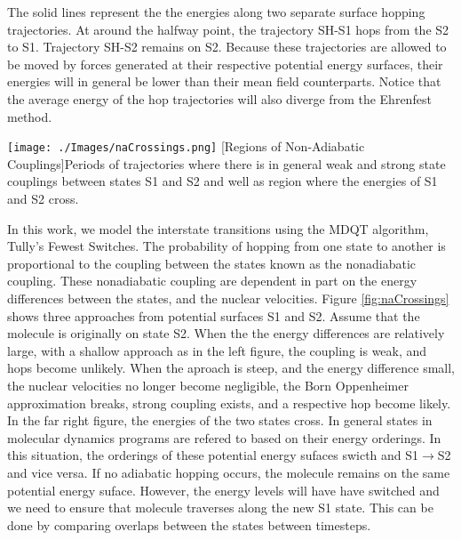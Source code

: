 The solid lines represent the the energies along two separate surface hopping trajectories.
At around the halfway point, the trajectory SH-S1 hops from the S2 to S1.
Trajectory SH-S2 remains on S2.
Because these trajectories are allowed to be moved by forces generated at their respective potential energy surfaces, their energies will in general be lower than their mean field counterparts.
Notice that the average energy of the hop trajectories will also diverge from the Ehrenfest method.

\noindent
\begin{minipage}[c]{\textwidth}
  \centering
  \texttt{[image: ./Images/naCrossings.png]}
  [Regions of Non-Adiabatic Couplings]{Periods of trajectories where there is in general weak and strong state couplings between states S1 and S2 and well as region where the energies of S1 and S2 cross.}
  \label{fig:naCrossings}
\end{minipage}\bigskip

In this work, we model the interstate transitions using the MDQT algorithm, Tully's Fewest Switches.
The probability of hopping from one state to another is proportional to the coupling between the states known as the nonadiabatic coupling.
These nonadiabatic coupling are dependent in part on the energy differences between the states, and the nuclear velocities.
Figure \ref{fig:naCrossings} shows three approaches from potential surfaces S1 and S2.
Assume that the molecule is originally on state S2.
When the the energy differences are relatively large, with a shallow approach as in the left figure, the coupling is weak, and hops become unlikely.
When the aproach is steep, and the energy difference small, the nuclear velocities no longer become negligible, the Born Oppenheimer approximation breaks, strong coupling exists, and a respective hop become likely.
In the far right figure, the energies of the two states cross.
In general states in molecular dynamics programs are refered to based on their energy orderings.
In this situation, the orderings of these potential energy sufaces swicth and S1\(\rightarrow\)S2 and vice versa.
If no adiabatic hopping occurs, the molecule remains on the same potential energy suface.
However, the energy levels will have have switched and we need to ensure that molecule traverses along the new S1 state.
This can be done by comparing overlaps between the states between timesteps.

